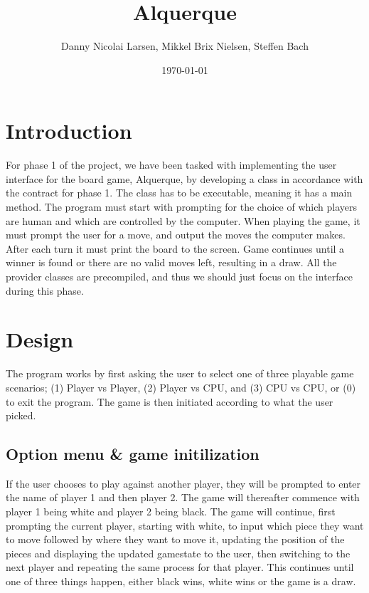 \documentclass[12pt, a4paper]{article}
\title{Alquerque}
\author{Danny Nicolai Larsen, Mikkel Brix Nielsen, Steffen Bach}
\date{\today}
\begin{document}
	\maketitle
	\newpage
	\tableofcontents
	\newpage
	\section{Introduction}
	For phase 1 of the project, we have been tasked with implementing the user interface for the board game, Alquerque, by developing a class in accordance with the contract for phase 1. The class has to be executable, meaning it has a main method. The program must start with prompting for the choice of which players are human and which are controlled by the computer. When playing the game, it must prompt the user for a move, and output the moves the computer makes. After each turn it must print the board to the screen. Game continues until a winner is found or there are no valid moves left, resulting in a draw. All the provider classes are precompiled, and thus we should just focus on the interface during this phase.
	
	\section{Design}
	
	The program works by first asking the user to select one of three playable game scenarios; (1) Player vs Player, (2) Player vs CPU, and (3) CPU vs CPU, or (0) to exit the program. The game is then initiated according to what the user picked.
	
	\subsection{Option menu \& game initilization}
	
	If the user chooses to play against another player, they will be prompted to enter the name of player 1 and then player 2. The game will thereafter commence with player 1 being white and player 2 being black. The game will continue, first prompting the current player, starting with white, to input which piece they want to move followed by where they want to move it, updating the position of the pieces and displaying the updated gamestate to the user, then switching to the next player and repeating the same process for that player. This continues until one of three things happen, either black wins, white wins or the game is a draw. 
	
\end{document}
